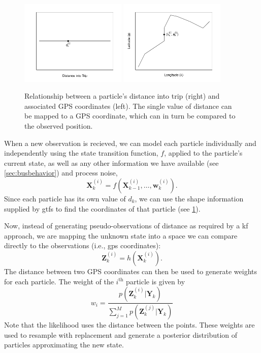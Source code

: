 \documentclass[12pt,a4paper]{article}
\newcommand{\bY}{\mathbf{Y}}
\newcommand{\bX}{\mathbf{X}}
\newcommand{\bZ}{\mathbf{Z}}
\newcommand{\mat}[1]{\mathbf{#1}}
\begin{document}
\begin{figure}[b]
  \centering
  \includegraphics[width=0.45\textwidth]{gps-dist2.jpg}
  \includegraphics[width=0.45\textwidth]{gps-dist1.jpg}
  \caption{Relationship between a particle's distance into trip (right) and associated GPS coordinates
  (left). The single value of distance can be mapped to a GPS coordinate,
  which can in turn be compared to the observed position.}
  \label{fig:gps-dist}
\end{figure}


When a new observation is recieved,
we can model each particle individually and independently using the state transition function, $f$,
applied to the particle's current state,
as well as any other information we have available (see \cref{sec:busbehavior}) and process noise,
\begin{equation}
  \label{eq:pf_statetransition}
  \bX_k^{(i)} = f(\bX_{k-1}^{(i)}, \ldots, \mat{w}_k^{(i)}).
\end{equation}
Since each particle has its own value of $d_k$, 
we can use the shape information supplied by \gls{gtfs} to
find the coordinates of that particle (see \cref{fig:gps-dist}).




Now, instead of generating pseudo-observations of distance
as required by a \gls{kf} approach, we are mapping the unknown state into 
a space we can compare directly to the observations (i.e., \gls{gps} coordinates):
\begin{equation}
  \label{eq:pf_measurement}
  \bZ_k^{(i)} = h(\bX_k^{(i)}).
\end{equation}
The distance between two GPS coordinates can then be used to generate weights for each particle.
The weight of the $i^{\mathrm{th}}$ particle is given by
\begin{equation}
  \label{eq:pf_likelihood}
  w_i = \frac{p(\bZ_k^{(i)} | \bY_k)}{\sum_{j=1}^M p(\bZ_k^{(j)} | \bY_k)}
\end{equation}
Note that the likelihood uses the distance between the points.
These weights are used to resample with replacement and generate a posterior distribution 
of particles approximating the new state.
\end{document}

